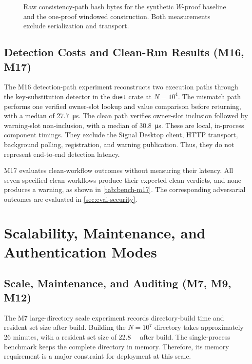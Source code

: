 \begin{figure}[ht]
\centering

\caption[Catch-up proof bytes versus offline window.]{Raw consistency-path hash bytes for the
synthetic $W$-proof baseline and the one-proof windowed construction. Both measurements exclude
serialization and transport.}
\label{fig:eval-catchup-plot}
\end{figure}

\subsection{Detection Costs and Clean-Run Results (M16, M17)}\label{ssec:eval-detection}

The M16 detection-path experiment reconstructs two execution paths through the key-substitution
detector in the \texttt{duet} crate at $N=10^{4}$. The mismatch path performs one verified
owner-slot lookup and value comparison before returning, with a median of
\SI{27.7}{\micro\second}. The clean path verifies owner-slot inclusion followed by warning-slot
non-inclusion, with a median of \SI{30.8}{\micro\second}. These are local, in-process component
timings. They exclude the Signal Desktop client, HTTP transport, background polling, registration,
and warning publication. Thus, they do not represent end-to-end detection latency.

M17 evaluates clean-workflow outcomes without measuring their latency. All seven specified clean
workflows produce their expected clean verdicts, and none produces a warning, as shown in
\cref{tab:bench-m17}. The corresponding adversarial outcomes are evaluated in
\cref{sec:eval-security}.

\section{Scalability, Maintenance, and Authentication Modes}\label{sec:eval-scale}

\subsection{Scale, Maintenance, and Auditing (M7, M9, M12)}\label{ssec:eval-scale}\label{ssec:eval-throughput}\label{ssec:eval-auditor}

The M7 large-directory scale experiment records directory-build time and resident set size after
build. Building the $N=10^{7}$ directory takes approximately 26 minutes, with a resident set size
of \SI{22.8}{\gibi\byte} after build. The single-process benchmark keeps the complete directory in
memory. Therefore, its memory requirement is a major constraint for deployment at this scale.

